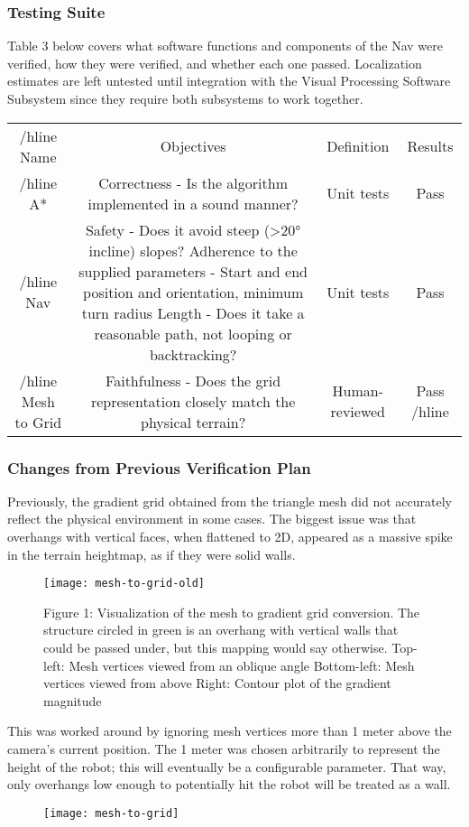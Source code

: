 \subsubsection{Testing Suite}\label{subsubsec:testing-suite}
Table 3 below covers what software functions and components of the Nav were verified, how they were verified, and
whether each one passed.
Localization estimates are left untested until integration with the Visual Processing Software Subsystem since they
require both subsystems to work together.
\begin{center}
    \begin{tabular}{ |c|c|c|c| }
        /hline
        Name & Objectives & Definition & Results \\
        /hline
        A* & Correctness - Is the algorithm implemented in a sound manner? & Unit tests & Pass \\
        /hline
        Nav & Safety - Does it avoid steep (>20° incline) slopes? Adherence to the supplied parameters - Start and end position and orientation, minimum turn radius Length - Does it take a reasonable path, not looping or backtracking? & Unit tests & Pass \\
        /hline
        Mesh to Grid & Faithfulness - Does the grid representation closely match the physical terrain? & Human-reviewed & Pass
        /hline
    \end{tabular}
\end{center}
\subsubsection{Changes from Previous Verification Plan}\label{subsubsec:changes-to-plan}
Previously, the gradient grid obtained from the triangle mesh did not accurately reflect the physical environment in
some cases.
The biggest issue was that overhangs with vertical faces, when flattened to 2D, appeared as a massive spike in the
terrain heightmap, as if they were solid walls.
\begin{figure}
    \texttt{[image: mesh-to-grid-old]}
    \caption{
        Figure 1: Visualization of the mesh to gradient grid conversion. The structure circled in green is an overhang with vertical walls that could be passed under, but this mapping would say otherwise.
        Top-left: Mesh vertices viewed from an oblique angle
        Bottom-left: Mesh vertices viewed from above
        Right: Contour plot of the gradient magnitude
    }
\end{figure}
This was worked around by ignoring mesh vertices more than 1 meter above the camera's current position.
The 1 meter was chosen arbitrarily to represent the height of the robot; this will eventually be a configurable
parameter.
That way, only overhangs low enough to potentially hit the robot will be treated as a wall.
\begin{figure}
    \texttt{[image: mesh-to-grid]}
\end{figure}